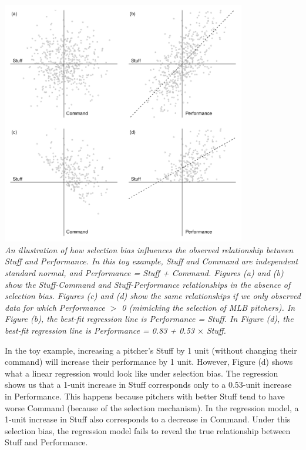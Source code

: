 \documentclass{article}
\begin{document}
    \begin{center}
    \includegraphics[width = 0.8\textwidth]{figures/stuff_selection_bias.pdf}\\
    {\it
      An illustration of how selection bias influences the observed relationship between Stuff and Performance. In this toy example, Stuff and Command are independent standard normal, and Performance = Stuff + Command. Figures (a) and (b) show the Stuff-Command and Stuff-Performance relationships in the absence of selection bias. Figures (c) and (d) show the same relationships if we only observed data for which Performance $>$ 0 (mimicking the selection of MLB pitchers). In Figure (b), the best-fit regression line is Performance = Stuff. In Figure (d), the best-fit regression line is Performance = 0.83 + 0.53 $\times$ Stuff.
    }
    \end{center}

    In the toy example, increasing a pitcher's Stuff by 1 unit (without changing their command) will increase their performance by 1 unit. However, Figure (d) shows what a linear regression would look like under selection bias. The regression shows us that a 1-unit increase in Stuff corresponds only to a 0.53-unit increase in Performance. This happens because pitchers with better Stuff tend to have worse Command (because of the selection mechanism). In the regression model, a 1-unit increase in Stuff also corresponds to a decrease in Command. Under this selection bias, the regression model fails to reveal the true relationship between Stuff and Performance.
\end{document}
